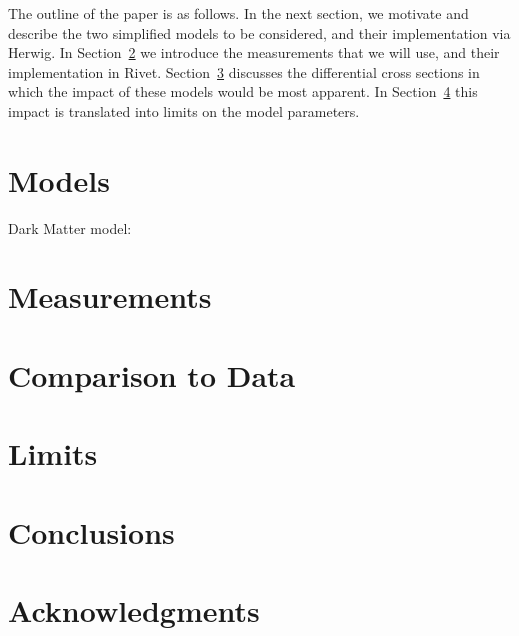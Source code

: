 \documentclass[floatfix]{article}
\begin{document}
The outline of the paper is as follows. In the next section, we motivate and describe the two 
simplified models to be considered, and their implementation via Herwig. In Section~\ref{sec:measurements}
we introduce the measurements that we will use, and their implementation in Rivet. Section~\ref{sec:kinematics}
discusses the differential cross sections in which the impact of these models would be 
most apparent. In Section~\ref{sec:limits} this impact is translated into limits on the model parameters.

\section{Models}\label{sec:models}


Dark Matter model:
\cite{Kahlhoefer:2015bea}

\section{Measurements}\label{sec:measurements}

\section{Comparison to Data}\label{sec:kinematics}

\section{Limits}\label{sec:limits}

\section{Conclusions}\label{sec:conclusions}

\section*{Acknowledgments}





\end{document}
